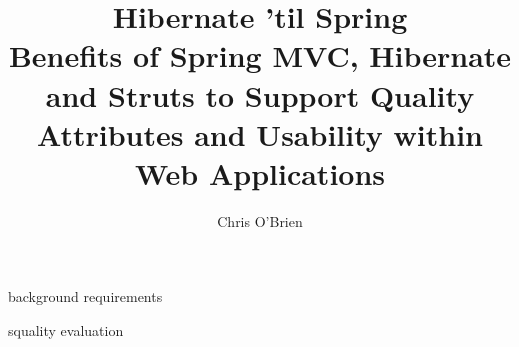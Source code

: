 \documentclass[a4paper,10pt,fleqn]{report}
\begin{document}
\title{Hibernate 'til Spring \\ Benefits of Spring MVC, Hibernate and Struts to Support Quality Attributes and Usability within Web Applications}
\author{Chris O'Brien}
\maketitle

\begin{abstract}      

\end{abstract}        

%
%
\tableofcontents

%
%
\listoffigures

%
%
\listoftables


 {background}
 {requirements}


 {squality}
 {evaluation}

\printbibliography
\appendix

\end{document}
